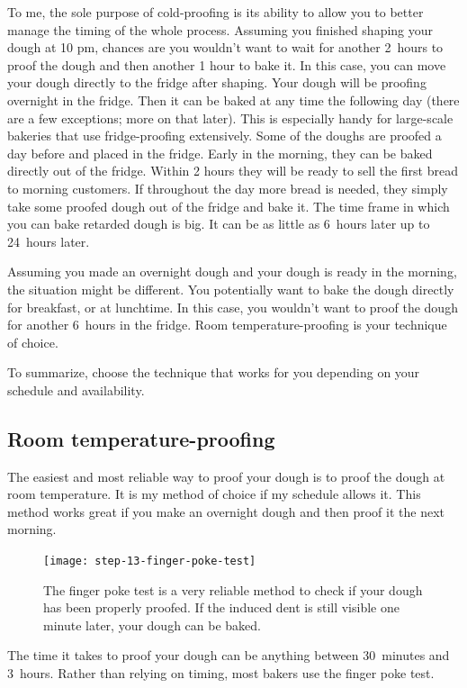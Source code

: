 To me, the sole purpose of cold-proofing is its ability to allow you
to better manage the timing of the whole process. Assuming you finished shaping
your dough at 10 pm, chances are you wouldn't want to wait for another
2~hours to proof the dough and then another 1 hour to bake it. In this case,
you can move your dough directly to the fridge after shaping. Your
dough will be proofing overnight in the fridge. Then it can be baked at any time
the following day (there are a few exceptions; more on that later).
This is especially handy for large-scale bakeries that use fridge-proofing
extensively. Some of the doughs are proofed a day before and placed in the fridge.
Early in the morning, they can be baked directly out of the fridge. Within 2
hours they will be ready to sell the first bread to morning customers. If
throughout the day more bread is needed, they simply take some proofed dough out
of the fridge and bake it. The time frame in which you can bake retarded
dough is big. It can be as little as 6~hours later up to 24~hours later.

Assuming you made an overnight dough and your dough is ready in the morning,
the situation might be different. You potentially want to bake the dough directly
for breakfast, or at lunchtime. In this case, you wouldn't want to proof the dough for
another 6~hours in the fridge. Room temperature-proofing is your technique
of choice.

To summarize, choose the technique that works for you depending on your
schedule and availability.

\subsection{Room temperature-proofing}

The easiest and most reliable way to proof your dough is to proof the dough at
room temperature. It is my method of choice if my schedule allows it. This method
works great if you make an overnight dough and then proof it the next
morning.

\begin{figure}[htb!]
  \texttt{[image: step-13-finger-poke-test]}
  \caption[The finger poke test]{The finger poke test is a very reliable
      method to check if your dough has been properly proofed. If the induced
      dent is still visible one minute later, your dough can be baked.}%
  \label{fig:shaping-finger-poke}
\end{figure}

The time it takes to proof your dough can be anything between 30~minutes and
3~hours. Rather than relying on timing, most bakers use the finger poke test.

